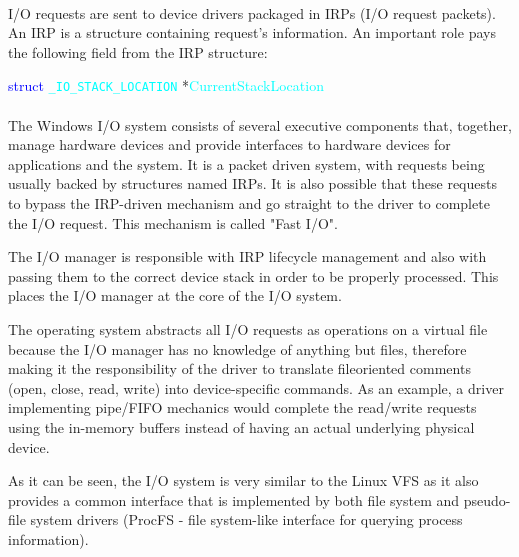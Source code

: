 		\paragraph{}
		I/O requests are sent to device drivers packaged in IRPs (I/O request packets). An IRP is a structure containing request's information. An important role pays the following field from the IRP structure: \cite{MSDNIORequests}
		\bigskip
		
			\centerline{\textcolor{blue}{struct} \textcolor{cyan}{\texttt{\_IO\_STACK\_LOCATION}} *\textcolor{cyan}{CurrentStackLocation}}
		
		\bigskip	
		\paragraph{}
		The Windows I/O system consists of several executive components that, together, manage hardware devices and provide interfaces to hardware devices for applications and the system\cite{WindowsInternals}. It is a packet driven system, with requests being usually backed by structures named IRPs. It is also possible that these requests to bypass the IRP-driven mechanism and go straight to the driver to complete the I/O request. This mechanism is called "Fast I/O".
		
		The I/O manager is responsible with IRP lifecycle management and also with passing them to the correct device stack in order to be properly processed. This places the I/O manager at the core of the I/O system. 
		
		
		The operating system abstracts all I/O requests as operations on a virtual file because the I/O manager has no knowledge of anything but files, therefore making it the responsibility of the driver to translate fileoriented comments (open, close, read, write) into device-specific commands\cite{WindowsInternals}. As an example, a driver implementing pipe/FIFO mechanics would complete the read/write requests using the in-memory buffers instead of having an actual underlying physical device. 
		
		As it can be seen, the I/O system is very similar to the Linux VFS as it also provides a common interface that is implemented by both file system and pseudo-file system drivers (ProcFS - file system-like interface for querying process information).\\
		
